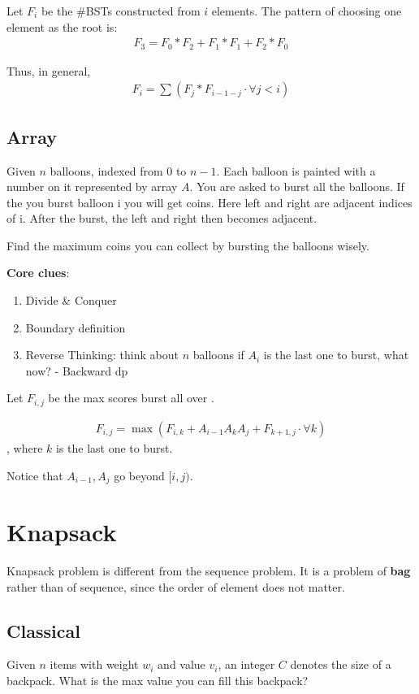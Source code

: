 {Let $F_i$ be the \#BSTs constructed from $i$ elements. The pattern of choosing one element as the root is: 
\begin{align*}
F_3 = F_0*F_2 + F_1*F_1 + F_2*F_0
\end{align*}

Thus, in general, 
\begin{align*}
F_i = \sum(F_{j}*F_{i-1-j} \cdot \forall j< i)
\end{align*}

\subsection{Array}
 Given $n$ balloons, indexed from 0 to $n-1$. Each balloon is painted with a number on it represented by array $A$. You are asked to burst all the balloons. If the you burst balloon i you will get  coins. Here left and right are adjacent indices of i. After the burst, the left and right then becomes adjacent.

Find the maximum coins you can collect by bursting the balloons wisely.

\textbf{Core clues}:
\begin{enumerate}
\item Divide \& Conquer
\item Boundary definition
\item Reverse Thinking: think about $n$ balloons if $A_i$ is the last one to burst, what now? - Backward dp
\end{enumerate}
Let $F_{i, j}$ be the max scores burst all over .

\begin{align*}
F_{i, j} = \max(F_{i,k} + A_{i-1}  A_k A_j + F_{k+1, j} \cdot \forall k)
\end{align*}
, where $k$ is the last one to burst. 

Notice that $A_{i-1}, A_{j}$ go beyond $[i, j)$.

\section{Knapsack}
Knapsack problem is different from the sequence problem. It is a problem of \textbf{bag} rather than of sequence, since the order of element does not matter. 

\subsection{Classical}
Given $n$ items with weight $w_i$ and value $v_i$, an integer $C$ denotes the size of a backpack. What is the max value you can fill this backpack?

}
